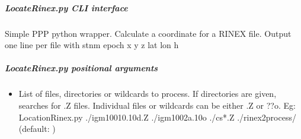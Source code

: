 \documentclass[letterpaper,10pt,english]{sphinxmanual}
\begin{document}
\subparagraph{LocateRinex.py \sphinxhyphen{} CLI interface}
\label{\detokenize{pgamit.com:LocateRinex.py---CLI-interface}}
\sphinxAtStartPar
Simple PPP python wrapper. Calculate a coordinate for a RINEX file. Output one line per file with stnm epoch x y z lat lon h

\begin{sphinxVerbatim}[commandchars=\\\{\}]
 \PYG{p}{[}\PYG{p}{]} \PYG{p}{[}\PYG{p}{]} \PYG{p}{[}\PYG{p}{]} \PYG{p}{[}\PYG{p}{]} \PYG{p}{[}\PYG{p}{]} \PYG{p}{[}\PYG{p}{]} \PYG{p}{[} \PYG{p}{[}\PYG{p}{[}\PYG{p}{]}\PYG{p}{]}\PYG{p}{]} \PYG{p}{[}\PYG{p}{]} \PYG{p}{[}\PYG{p}{]} \PYG{p}{[}\PYG{p}{]}
               \PYG{p}{[}      \PYG{p}{[}     \PYG{p}{]}\PYG{p}{]}
               \PYG{p}{[} \PYG{p}{]} \PYG{p}{[} \PYG{p}{]}
               \PYG{p}{[} \PYG{p}{]} \PYG{p}{[}\PYG{p}{]} \PYG{p}{[} \PYG{p}{]}
               \PYG{p}{[}   \PYG{p}{]}
                \PYG{p}{[} \PYG{p}{]}
\end{sphinxVerbatim}


\subparagraph{LocateRinex.py positional arguments}
\label{\detokenize{pgamit.com:LocateRinex.py-positional-arguments}}\begin{itemize}
\item {} 
\sphinxAtStartPar
{\hyperref[\detokenize{pgamit.com:LocateRinex.py-files}]{}} \sphinxhyphen{} List of files, directories or wildcards to process. If directories are given, searches for .Z files. Individual files or wildcards can be either .Z or ??o. Eg: LocationRinex.py ./igm10010.10d.Z ./igm1002a.10o ./cs*.Z ./rinex2process/ (default: )

\end{itemize}
\end{document}
